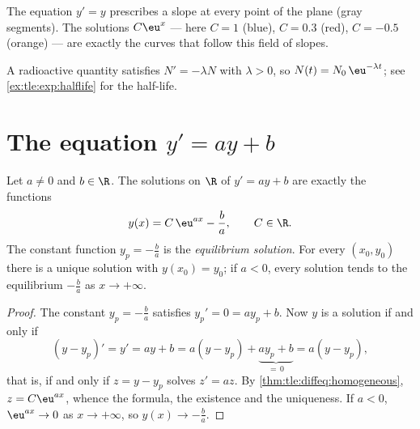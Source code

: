 \begin{omfigure}

{\small The equation $y' = y$ prescribes a slope at every point of the
plane (gray segments). The solutions $C\eu^{x}$ --- here $C = 1$ (blue),
$C = 0.3$ (red), $C = -0.5$ (orange) --- are exactly the curves that
follow this field of slopes.}
\end{omfigure}

\begin{example}\label{ex:tle:diffeq:decay}
A radioactive quantity satisfies $N' = -\lambda N$ with $\lambda > 0$, so
$N(t) = N_0\,\eu^{-\lambda t}$; see \cref{ex:tle:exp:halflife} for the
half-life.
\end{example}

\section{The equation \texorpdfstring{$y' = ay + b$}{y' = ay + b}}

\begin{theorem}[Solutions of $y' = ay + b$]\label{thm:tle:diffeq:affine}
Let $a \neq 0$ and $b \in \R$. The solutions on $\R$ of $y' = ay + b$ are
exactly the functions
\[
y(x) = C\,\eu^{ax} - \frac{b}{a}, \qquad C \in \R .
\]
The constant function $y_p = -\frac ba$ is the \emph{equilibrium solution}.
For every $(x_0, y_0)$ there is a unique solution with $y(x_0) = y_0$; if
$a < 0$, every solution tends to the equilibrium $-\frac ba$ as
$x \to +\infty$.
\end{theorem}

\begin{proof}
The constant $y_p = -\frac{b}{a}$ satisfies $y_p' = 0 = a y_p + b$. Now $y$
is a solution if and only if
\[
(y - y_p)' = y' = ay + b = a(y - y_p) + \underbrace{a y_p + b}_{=\,0}
= a (y - y_p),
\]
that is, if and only if $z = y - y_p$ solves $z' = az$. By
\cref{thm:tle:diffeq:homogeneous}, $z = C\eu^{ax}$, whence the formula, the
existence and the uniqueness. If $a < 0$, $\eu^{ax} \to 0$ as
$x \to +\infty$, so $y(x) \to -\frac ba$.
\end{proof}


